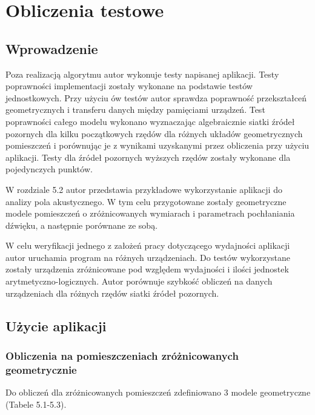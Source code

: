 \chapter{Obliczenia testowe}\label{cha:ot}



\section{Wprowadzenie}\label{sec:wprowadzenie}


Poza realizacją algorytmu autor wykonuje testy napisanej aplikacji. Testy poprawności implementacji zostały wykonane na podstawie testów jednostkowych. Przy użyciu ów testów autor sprawdza poprawność przekształceń geometrycznych i transferu danych między pamięciami urządzeń. Test poprawności całego modelu wykonano wyznaczając algebraicznie siatki źródeł pozornych dla kilku początkowych rzędów dla różnych układów geometrycznych pomieszczeń i porównując je z wynikami uzyskanymi przez obliczenia przy użyciu aplikacji. Testy dla źródeł pozornych wyższych rzędów zostały wykonane dla pojedynczych punktów.

W rozdziale 5.2 autor przedstawia przykładowe wykorzystanie aplikacji do analizy pola akustycznego. W tym celu przygotowane zostały geometryczne modele pomieszczeń o zróżnicowanych wymiarach i parametrach pochłaniania dźwięku, a następnie  porównane ze sobą.

W celu weryfikacji jednego z założeń pracy dotyczącego wydajności aplikacji autor uruchamia program na różnych urządzeniach. Do testów wykorzystane zostały urządzenia  zróżnicowane pod względem wydajności i ilości jednostek arytmetyczno-logicznych. Autor porównuje szybkość obliczeń na danych urządzeniach dla różnych rzędów siatki źródeł pozornych. 

\section{Użycie aplikacji}\label{sec:asdasd}

\subsection{Obliczenia na pomieszczeniach zróżnicowanych geometrycznie}\label{sec:imstest1}

Do obliczeń dla zróżnicowanych pomieszczeń zdefiniowano 3 modele geometryczne (Tabele 5.1-5.3).

